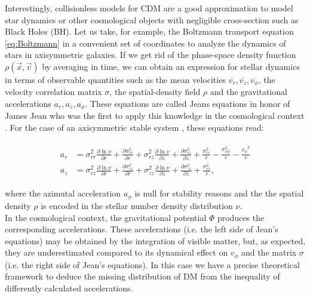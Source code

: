 Interestingly, collisionless models for CDM are a good approximation to model star dynamics or other cosmological objects with negligible cross-section such as Black Holes (BH). Let us take, for example, the Boltzmann transport equation \eqref{eq:Boltzmann} in a convenient set of coordinates to analyze the dynamics of stars in axisymmetric galaxies. If we get rid of the phase-space density function $\rho(\vec{x},\vec{v})$ by averaging in time, we can obtain an expression for stellar dynamics in terms of observable quantities such as the mean velocities $\overline{v_r},\overline{v_z},\overline{v_\phi}$, the velocity correlation matrix $\sigma$, the spatial-density field $\rho$ and the gravitational accelerations $a_r,a_z,a_\phi$. These equations are called Jeans equations in honor of James Jean who was the first to apply this knowledge in the cosmological context \cite{Jeans_1915}. For the case of an axisymmetric stable system \cite{Loebman_et_al._2012}, these equations read:  

\begin{align}
\begin{aligned}
a_r & = \sigma^2_{rr} \frac{\partial \ln \nu}{\partial r} + \frac{\partial \sigma^2_{rr} }{\partial r} + \sigma^2_{rz} \frac{\partial \ln \nu}{\partial z} + \frac{\partial \sigma^2_{rz} }{\partial z} +  \frac{\sigma^2_{rr}}{r}-\frac{\sigma^2_{\phi\phi}}{r}-\frac{\overline{v_\phi}^2}{r}\\
a_z & =  \sigma^2_{rz} \frac{\partial \ln \nu}{\partial r} + \frac{\partial \sigma^2_{rz} }{\partial r} + \sigma^2_{zz}\frac{\partial \ln \nu}{\partial z} + \frac{\partial \sigma^2_{zz} }{\partial z} +  \frac{\sigma^2_{rz}}{r},
\end{aligned}
\label{eq:Jeans}
\end{align}

where the azimutal acceleration $a_{\phi}$ is null for stability reasons and the the spatial density $\rho$ is encoded in the stellar number density distribution $\nu$.\\

In the cosmological context, the gravitational potential $\Phi$ produces the corresponding accelerations. These accelerations (i.e. the left side of Jean's equations) may be obtained by the integration of visible matter, but, as expected, they are underestimated compared to its dynamical effect on $v_{\phi}$ and the matrix $\sigma$ (i.e. the right side of Jean's equations). In this case we have a precise theoretical framework to deduce the missing distribution of DM from the inequality of differently calculated accelerations.\\


